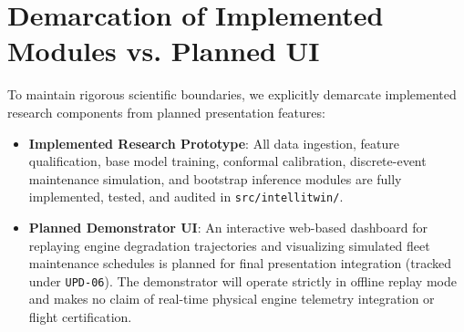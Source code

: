\section{Demarcation of Implemented Modules vs. Planned UI}
To maintain rigorous scientific boundaries, we explicitly demarcate implemented research components from planned presentation features:
\begin{itemize}
    \item \textbf{Implemented Research Prototype}: All data ingestion, feature qualification, base model training, conformal calibration, discrete-event maintenance simulation, and bootstrap inference modules are fully implemented, tested, and audited in \texttt{src/intellitwin/}.
    \item \textbf{Planned Demonstrator UI}: An interactive web-based dashboard for replaying engine degradation trajectories and visualizing simulated fleet maintenance schedules is planned for final presentation integration (tracked under \texttt{UPD-06}). The demonstrator will operate strictly in offline replay mode and makes no claim of real-time physical engine telemetry integration or flight certification.
\end{itemize}
